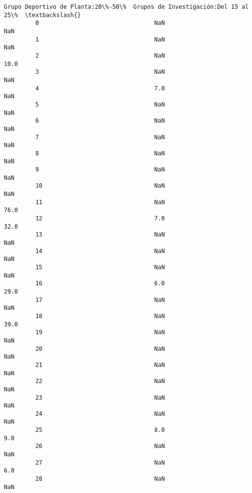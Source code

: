 \documentclass[11pt]{article}
\begin{document}
\begin{Verbatim}[commandchars=\\\{\}]
             Grupo Deportivo de Planta:20\%-50\%  Grupos de Investigación:Del 15 al 25\%  \textbackslash{}
         0                                 NaN                                    NaN   
         1                                 NaN                                    NaN   
         2                                 NaN                                   10.0   
         3                                 NaN                                    NaN   
         4                                 7.0                                    NaN   
         5                                 NaN                                    NaN   
         6                                 NaN                                    NaN   
         7                                 NaN                                    NaN   
         8                                 NaN                                    NaN   
         9                                 NaN                                    NaN   
         10                                NaN                                    NaN   
         11                                NaN                                   76.0   
         12                                7.0                                   32.0   
         13                                NaN                                    NaN   
         14                                NaN                                    NaN   
         15                                NaN                                    NaN   
         16                                6.0                                   29.0   
         17                                NaN                                    NaN   
         18                                NaN                                   39.0   
         19                                NaN                                    NaN   
         20                                NaN                                    NaN   
         21                                NaN                                    NaN   
         22                                NaN                                    NaN   
         23                                NaN                                    NaN   
         24                                NaN                                    NaN   
         25                                8.0                                    9.0   
         26                                NaN                                    NaN   
         27                                NaN                                    6.0   
         28                                NaN                                    NaN   

\end{Verbatim}
\end{document}
